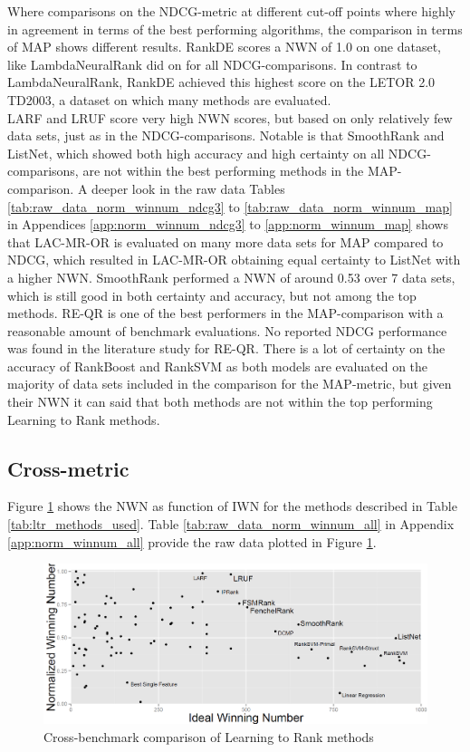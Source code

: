 Where comparisons on the \ac{NDCG}-metric at different cut-off points where highly in agreement in terms of the best performing algorithms, the comparison in terms of \ac{MAP} shows different results. RankDE scores a \ac{NWN} of 1.0 on one dataset, like LambdaNeuralRank did on for all \ac{NDCG}-comparisons. In contrast to LambdaNeuralRank, RankDE achieved this highest score on the LETOR 2.0 TD2003, a dataset on which many methods are evaluated.\\

LARF and LRUF score very high \ac{NWN} scores, but based on only relatively few data sets, just as in the \ac{NDCG}-comparisons. Notable is that SmoothRank and ListNet, which showed both high accuracy and high certainty on all \ac{NDCG}-comparisons, are not within the best performing methods in the \ac{MAP}-comparison. A deeper look in the raw data Tables \ref{tab:raw_data_norm_winnum_ndcg3} to \ref{tab:raw_data_norm_winnum_map} in Appendices \ref{app:norm_winnum_ndcg3} to \ref{app:norm_winnum_map} shows that LAC-MR-OR is evaluated on many more data sets for \ac{MAP} compared to \ac{NDCG}, which resulted in LAC-MR-OR obtaining equal certainty to ListNet with a higher \ac{NWN}. SmoothRank performed a \ac{NWN} of around 0.53 over 7 data sets, which is still good in both certainty and accuracy, but not among the top methods. RE-QR is one of the best performers in the \ac{MAP}-comparison with a reasonable amount of benchmark evaluations. No reported \ac{NDCG} performance was found in the literature study for RE-QR. There is a lot of certainty on the accuracy of RankBoost and Rank\ac{SVM} as both models are evaluated on the majority of data sets included in the comparison for the \ac{MAP}-metric, but given their \ac{NWN} it can said that both methods are not within the top performing Learning to Rank methods.

\subsection{Cross-metric}
Figure \ref{fig:normalised_winning_number_all} shows the \ac{NWN} as function of \ac{IWN} for the methods described in Table \ref{tab:ltr_methods_used}. Table \ref{tab:raw_data_norm_winnum_all} in Appendix \ref{app:norm_winnum_all} provide the raw data plotted in Figure \ref{fig:normalised_winning_number_all}.\\

\begin{figure}[!h]
\includegraphics[scale=0.33]{gfx/combined_normalized_winnum}
\caption{Cross-benchmark comparison of Learning to Rank methods}
\label{fig:normalised_winning_number_all}
\end{figure}

